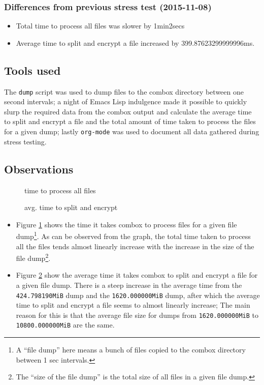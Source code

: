 \subsubsection{Differences from previous stress test (2015-11-08)}

\begin{itemize}
\item Total time to process all files was slower by 1min2secs
\item Average time to split and encrypt a file increased by
  399.87623299999996ms.
\end{itemize}

\subsection{Tools used}\label{5-st-tu}

The \verb+dump+ script\cite{program:dump} was used to dump files to
the combox directory between one second intervals; a night of Emacs
Lisp indulgence made it possible to quickly slurp the required data
from the combox output and calculate the average time to split and
encrypt a file and the total amount of time taken to process the files
for a given dump\cite{program:dumps.el}; lastly \verb+org-mode+ was
used to document all data gathered during stress
testing\cite{doc:benchmarks.org}.

\subsection{Observations}\label{5-st-o}

\begin{figure}[h]
\centering

\caption{time to process all files}
\label{fig:5-st-tt}
\end{figure}

\begin{figure}[h]
\centering

\caption{avg. time to split and encrypt}
\label{fig:5-st-atsae}
\end{figure}


\begin{itemize}
\item Figure \ref{fig:5-st-tt} shows the time it takes combox to
  process files for a given file dump\footnote{A ``file dump'' here
    means a bunch of files copied to the combox directory between 1
    sec intervals.}. As can be observed from the graph, the total time
  taken to process all the files tends almost linearly increase with
  the increase in the size of the file dump\footnote{The ``size of the
    file dump'' is the total size of all files in a given file dump.}.
\item Figure \ref{fig:5-st-atsae} show the average time it takes
  combox to split and encrypt a file for a given file dump. There is a
  steep increase in the average time from the \verb+424.798190MiB+
  dump and the \verb+1620.000000MiB+ dump, after which the average
  time to split and encrypt a file seems to almost linearly increase;
  The main reason for this is that the average file size for dumps
  from \verb+1620.000000MiB+ to \verb+10800.000000MiB+ are the same.
\end{itemize}

